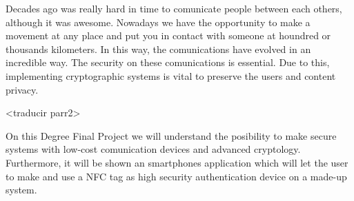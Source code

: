 \documentclass[../PFC.tex]{subfiles}
\begin{document}

Decades ago was really hard in time to comunicate people between each others, although it was awesome. Nowadays we have the opportunity to make a movement at any place and put you in contact with someone at houndred or thousands kilometers. In this way, the comunications have evolved in an incredible way. The security on these comunications is essential. Due to this, implementing cryptographic systems is vital to preserve the users and content privacy.

<traducir parr2>


On this Degree Final Project we will understand the posibility to make secure systems with low-cost comunication devices and advanced cryptology. Furthermore, it will be shown an smartphones application which will let the user to make and use a NFC tag as high security authentication device on a made-up system.

\end{document}
